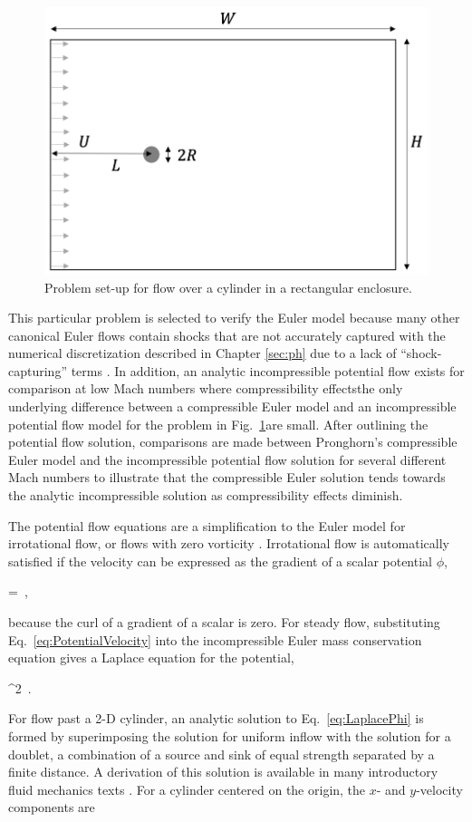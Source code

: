 \begin{figure}[!h]
\centering
\includegraphics[width=0.5\linewidth]{figs/pf_geometry.png}
\caption{Problem set-up for flow over a cylinder in a rectangular enclosure.}
\label{fig:pf_geometry}
\end{figure}

This particular problem is selected to verify the Euler model because many other canonical Euler flows contain shocks that are not accurately captured with the numerical discretization described in Chapter \ref{sec:ph} due to a lack of ``shock-capturing'' terms \cite{hughes_1986,tezduyar_1986}. In addition, an analytic incompressible potential flow exists for comparison at low Mach numbers where compressibility effects\mdash the only underlying difference between a compressible Euler model and an incompressible potential flow model for the problem in Fig.\ \ref{fig:pf_geometry}\mdash are small. After outlining the potential flow solution, comparisons are made between Pronghorn's compressible Euler model and the incompressible potential flow solution for several different Mach numbers to illustrate that the compressible Euler solution tends towards the analytic incompressible solution as compressibility effects diminish.

The potential flow equations are a simplification to the Euler model for irrotational flow, or flows with zero vorticity \cite{munson,hirsch}. Irrotational flow is automatically satisfied if the velocity can be expressed as the gradient of a scalar potential \(\phi\),

\beq
\label{eq:PotentialVelocity}
=\nabla\phi\ ,
\eeq

\noindent because the curl of a gradient of a scalar is zero. For steady flow, substituting Eq.\ \eqref{eq:PotentialVelocity} into the incompressible Euler mass conservation equation gives a Laplace equation for the potential,

\beq
\label{eq:LaplacePhi}
\nabla^2\ .
\eeq

\noindent For flow past a 2-D cylinder, an analytic solution to Eq.\ \eqref{eq:LaplacePhi} is formed by superimposing the solution for uniform inflow with the solution for a doublet, a combination of a source and sink of equal strength separated by a finite distance. A derivation of this solution is available in many introductory fluid mechanics texts \cite{munson}. For a cylinder centered on the origin, the \(x\)- and \(y\)-velocity components are

